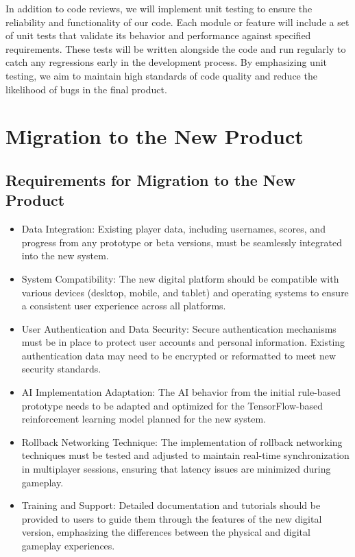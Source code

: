 \documentclass{article}
\begin{document}
In addition to code reviews, we will implement unit testing to ensure the reliability and functionality of our code. Each module or feature will include a set of unit tests that validate its behavior and performance against specified requirements. These tests will be written alongside the code and run regularly to catch any regressions early in the development process. By emphasizing unit testing, we aim to maintain high standards of code quality and reduce the likelihood of bugs in the final product.

\section{Migration to the New Product}

\subsection{Requirements for Migration to the New Product}
\begin{itemize}
    \item Data Integration: Existing player data, including usernames, scores, and progress from any prototype or beta versions, must be seamlessly integrated into the new system.
    \item System Compatibility: The new digital platform should be compatible with various devices (desktop, mobile, and tablet) and operating systems to ensure a consistent user experience across all platforms.
    \item User Authentication and Data Security: Secure authentication mechanisms must be in place to protect user accounts and personal information. Existing authentication data may need to be encrypted or reformatted to meet new security standards.
    \item AI Implementation Adaptation: The AI behavior from the initial rule-based prototype needs to be adapted and optimized for the TensorFlow-based reinforcement learning model planned for the new system.
    \item Rollback Networking Technique: The implementation of rollback networking techniques must be tested and adjusted to maintain real-time synchronization in multiplayer sessions, ensuring that latency issues are minimized during gameplay.
    \item Training and Support: Detailed documentation and tutorials should be provided to users to guide them through the features of the new digital version, emphasizing the differences between the physical and digital gameplay experiences.
\end{itemize}
\end{document}
